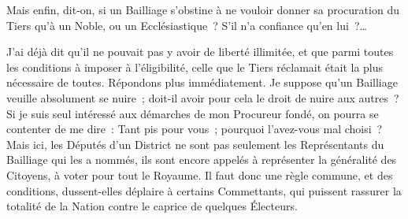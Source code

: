 \documentclass[french,twoside]{book} %
\begin{document}
Mais enfin, dit-on, si un Bailliage s’obstine à ne vouloir donner sa procuration du Tiers qu’à un Noble, ou un Ecclésiastique ? S’il n’a confiance qu’en lui ?…\par
J’ai déjà dit qu’il ne pouvait pas y avoir de liberté illimitée, et que parmi toutes les conditions à imposer à l’éligibilité, celle que le Tiers réclamait était la plus nécessaire de toutes. Répondons plus immédiatement. Je suppose qu’un Bailliage veuille absolument se nuire ; doit-il avoir pour cela le droit de nuire aux autres ? Si je suis seul intéressé aux démarches de mon Procureur fondé, on pourra se contenter de me dire : Tant pis pour vous ; pourquoi l’avez-vous mal choisi ? Mais ici, les Députés d’un District ne sont pas seulement les Représentants du Bailliage qui les a nommés, ils sont encore appelés à représenter la généralité des Citoyens, à voter pour tout le Royaume. Il faut donc une règle commune, et des conditions, dussent-elles déplaire à certains Commettants, qui puissent rassurer la totalité de la Nation contre le caprice de quelques Électeurs.
\end{document}
